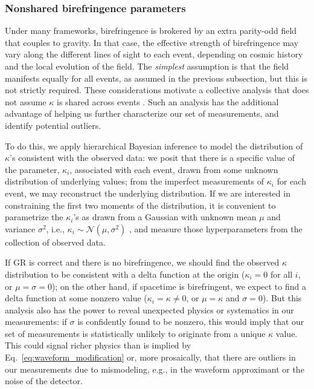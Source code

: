\documentclass[aps,prd,twocolumn,superscriptaddress,preprintnumbers,floatfix,nofootinbib]{revtex4-2}
\begin{document}
\subsubsection{Nonshared birefringence parameters}
\label{sec:method:hier}

Under many frameworks, birefringence is brokered by an extra parity-odd field that couples to gravity.
In that case, the effective strength of birefringence may vary along the different lines of sight to each event, depending on cosmic history and the local evolution of the field.
The \emph{simplest} assumption is that the field manifests equally for all events, as assumed in the previous subsection, but this is not strictly required.
These considerations motivate a collective analysis that does not assume $\kappa$ is shared across events \cite{Zimmerman:2019wzo,Isi:2022cii}.
Such an analysis has the additional advantage of helping us further characterize our set of measurements, and identify potential outliers.

To do this, we apply hierarchical Bayesian inference \cite{Loredo:2004nn} to model the distribution of $\kappa$'s consistent with the observed data:
we posit that there is a specific value of the parameter, $\kappa_i$, associated with each event, drawn from some unknown distribution of underlying values; from the imperfect measurements of $\kappa_i$ for each event, we may reconstruct the underlying distribution.
If we are interested in constraining the first two moments of the distribution, it is convenient to parametrize the $\kappa_i$'s as drawn from a Gaussian with unknown mean $\mu$ and variance $\sigma^2$, i.e., $\kappa_i \sim \mathcal{N}(\mu, \sigma^2)$ \cite{Isi:2019asy}, and measure those hyperparameters from the collection of observed data.

If \ac{GR} is correct and there is no birefringence, we should find the observed $\kappa$ distribution to be consistent with a delta function at the origin ($\kappa_i = 0$ for all $i$, or $\mu=\sigma=0$); on the other hand, if spacetime is birefringent, we expect to find a delta function at some nonzero value ($\kappa_i = \kappa \neq 0$, or $\mu = \kappa$ and $\sigma=0$).
But this analysis also has the power to reveal unexpected physics or systematics in our measurements: if $\sigma$ is confidently found to be nonzero, this would imply that our set of measurements is statistically unlikely to originate from a unique $\kappa$ value.
This could signal richer physics than is implied by Eq.~\eqref{eq:waveform_modification} or, more prosaically, that there are outliers in our measurements due to mismodeling, e.g., in the waveform approximant or the noise of the detector.
\end{document}
